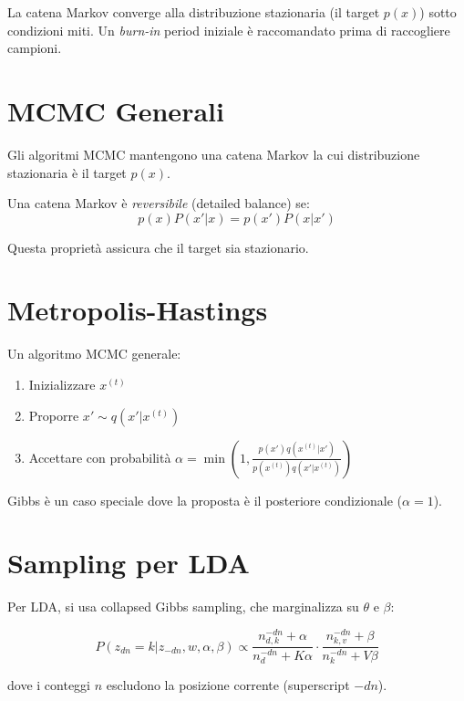 La catena Markov converge alla distribuzione stazionaria (il target $p(x)$) sotto condizioni miti. Un \textit{burn-in} period iniziale è raccomandato prima di raccogliere campioni.

\section{MCMC Generali}

Gli algoritmi MCMC mantengono una catena Markov la cui distribuzione stazionaria è il target $p(x)$.

\begin{definition}
  Una catena Markov è \textit{reversibile} (detailed balance) se:
  \[p(x) P(x'|x) = p(x') P(x|x')\]
\end{definition}

Questa proprietà assicura che il target sia stazionario.

\section{Metropolis-Hastings}

Un algoritmo MCMC generale:

\begin{theorem}
  \begin{enumerate}
    \item Inizializzare $x^{(t)}$
    \item Proporre $x' \sim q(x'|x^{(t)})$
    \item Accettare con probabilità $\alpha = \min\left(1, \frac{p(x')q(x^{(t)}|x')}{p(x^{(t)})q(x'|x^{(t)})}\right)$
  \end{enumerate}
\end{theorem}

Gibbs è un caso speciale dove la proposta è il posteriore condizionale ($\alpha = 1$).

\section{Sampling per LDA}

Per LDA, si usa collapsed Gibbs sampling, che marginalizza su $\theta$ e $\beta$:

\[P(z_{dn} = k | z_{-dn}, w, \alpha, \beta) \propto \frac{n_{d,k}^{-dn} + \alpha}{n_{d}^{-dn} + K\alpha} \cdot \frac{n_{k,v}^{-dn} + \beta}{n_{k}^{-dn} + V\beta}\]

dove i conteggi $n$ escludono la posizione corrente (superscript $-dn$).

